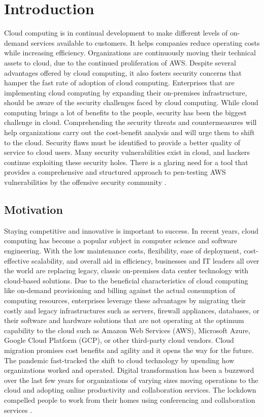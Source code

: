 
\chapter{Introduction}

\par Cloud computing is in continual development to make different levels of on-demand services available to customers.
It helps companies reduce operating costs while increasing efficiency.
Organizations are continuously moving their technical assets to cloud, due to the continued proliferation of AWS. Despite several advantages offered by cloud computing, it also fosters security concerns that hamper the fast rate of adoption of cloud computing.
Enterprises that are implementing cloud computing by expanding their on-premises infrastructure, should be aware of the security challenges faced by cloud computing.
While cloud computing brings a lot of benefits to the people, security has been the biggest challenge in cloud.
Comprehending the security threats and countermeasures will help organizations carry out the cost-benefit analysis and will urge them to shift to the cloud.
Security flaws must be identified to provide a better
quality of service to cloud users.
Many security vulnerabilities exist in cloud, and hackers
continue exploiting these security holes.
There is a glaring need for a tool that provides a comprehensive and structured approach to pen-testing AWS vulnerabilities by the offensive security community \cite{2}.

\section{Motivation}
\par Staying competitive and innovative is important to success.
In recent years, cloud computing has become a
popular subject in computer science and software engineering.
With the low maintenance costs, flexibility, ease of deployment, cost-effective scalability, and overall aid in efficiency, businesses and IT leaders all over the world are replacing legacy, classic on-premises data center technology with cloud-based solutions. Due to the beneficial characteristics of cloud computing like on-demand provisioning and billing against the actual consumption of computing resources, enterprises leverage these advantages by migrating their costly and legacy infrastructures such as servers, firewall appliances, databases, or their software and hardware solutions that are not operating at the optimum capability to the cloud such as Amazon Web Services (AWS), Microsoft Azure, Google Cloud Platform (GCP), or other third-party cloud vendors. Cloud migration promises cost benefits and agility and it opens the way for the future. The pandemic fast-tracked the shift to cloud technology by upending how organizations worked and operated. Digital transformation has been a buzzword over the last few years for organizations of varying sizes moving operations to the cloud and adopting online productivity and collaboration services. The lockdown compelled people to work from their homes using conferencing and collaboration services \cite{2}.


